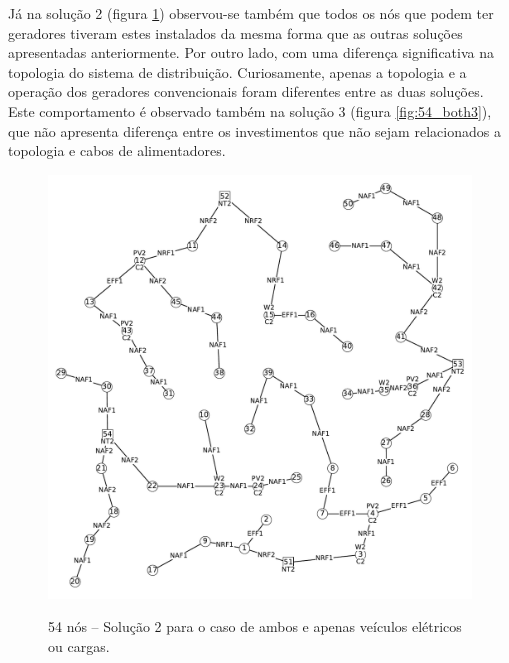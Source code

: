 Já na solução 2 (figura \ref{fig:54_both2}) observou-se também que todos os nós que podem ter geradores tiveram estes instalados da mesma forma que as outras soluções apresentadas anteriormente. Por outro lado, com uma diferença significativa na topologia do sistema de distribuição. Curiosamente, apenas a topologia e a operação dos geradores convencionais foram diferentes entre as duas soluções. Este comportamento é observado também na solução 3 (figura \ref{fig:54_both3}), que não apresenta diferença entre os investimentos que não sejam relacionados a topologia e cabos de alimentadores.
\begin{figure}[h]
 	\centering
    \caption{54 nós -- Solução 2 para o caso de ambos e apenas veículos elétricos ou cargas.}
    \includegraphics[width=1.02\textwidth]{cap4/resultados/54_bus_both2.pdf}\\
    \label{fig:54_both2}
\end{figure}

